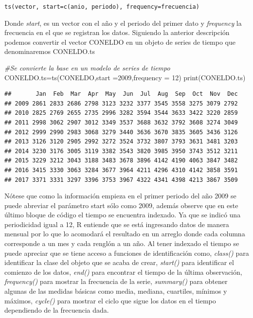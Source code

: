 \documentclass[
  spanish,
]{book}
\newenvironment{Shaded}{\begin{snugshade}}{\end{snugshade}}
\newcommand{\AttributeTok}[1]{\textcolor[rgb]{0.77,0.63,0.00}{#1}}
\newcommand{\CommentTok}[1]{\textcolor[rgb]{0.56,0.35,0.01}{\textit{#1}}}
\newcommand{\DecValTok}[1]{\textcolor[rgb]{0.00,0.00,0.81}{#1}}
\newcommand{\FunctionTok}[1]{\textcolor[rgb]{0.00,0.00,0.00}{#1}}
\newcommand{\NormalTok}[1]{#1}
\newcommand{\OtherTok}[1]{\textcolor[rgb]{0.56,0.35,0.01}{#1}}
\theoremstyle{remark}
\begin{document}
\begin{verbatim}
ts(vector, start=c(anio, periodo), frequency=frecuencia)
\end{verbatim}

Donde \emph{start}, es un vector con el año y el periodo del primer dato y \emph{frequency} la frecuencia en el que se registran los datos. Siguiendo la anterior descripción podemos convertir el vector CONELDO en un objeto de series de tiempo que denominaremos CONELDO.ts

\begin{Shaded}
\begin{Highlighting}[]
\CommentTok{\#Se convierte la base en un modelo de series de tiempo}
\NormalTok{CONELDO.ts}\OtherTok{=}\FunctionTok{ts}\NormalTok{(CONELDO,}\AttributeTok{start =}\DecValTok{2009}\NormalTok{,}\AttributeTok{frequency =} \DecValTok{12}\NormalTok{)}
\FunctionTok{print}\NormalTok{(CONELDO.ts)}
\end{Highlighting}
\end{Shaded}

\begin{verbatim}
##       Jan  Feb  Mar  Apr  May  Jun  Jul  Aug  Sep  Oct  Nov  Dec
## 2009 2861 2833 2686 2798 3123 3232 3377 3545 3558 3275 3079 2792
## 2010 2825 2769 2655 2735 2996 3282 3594 3544 3633 3422 3220 2859
## 2011 2998 3062 2907 3012 3349 3537 3688 3632 3792 3608 3274 3049
## 2012 2999 2990 2983 3068 3279 3440 3636 3670 3835 3605 3436 3126
## 2013 3126 3120 2905 2992 3272 3524 3732 3807 3793 3631 3481 3203
## 2014 3230 3176 3005 3119 3382 3543 3820 3985 3950 3743 3512 3211
## 2015 3229 3212 3043 3188 3483 3678 3896 4142 4190 4063 3847 3482
## 2016 3415 3330 3063 3284 3677 3964 4211 4296 4310 4142 3858 3591
## 2017 3371 3331 3297 3396 3753 3967 4322 4341 4398 4213 3867 3509
\end{verbatim}

Nótese que como la información empieza en el primer periodo del año 2009 se puede abreviar el parámetro start sólo como 2009, además observe que en este último bloque de código el tiempo se encuentra indexado. Ya que se indicó una periodicidad igual a 12, R entiende que se está ingresando datos de manera mensual por lo que lo acomodará el resultado en un arreglo donde cada columna corresponde a un mes y cada renglón a un año. Al tener indexado el tiempo se puede apreciar que se tiene acceso a funciones de identificación como, \emph{class()} para identificar la clase del objeto que se acaba de crear, \emph{start()} para identificar el comienzo de los datos, \emph{end()} para encontrar el tiempo de la última observación, \emph{frequency()} para mostrar la frecuencia de la serie, \emph{summary()} para obtener algunas de las medidas básicas como media, mediana, cuartiles, mínimos y máximos, \emph{cycle()} para mostrar el ciclo que sigue los datos en el tiempo dependiendo de la frecuencia dada.
\end{document}
